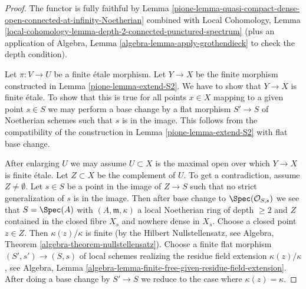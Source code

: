 \begin{proof}

The functor is fully faithful by
Lemma \ref{pione-lemma-quasi-compact-dense-open-connected-at-infinity-Noetherian}
combined with Local Cohomology,
Lemma \ref{local-cohomology-lemma-depth-2-connected-punctured-spectrum}
(plus an application of
Algebra, Lemma \ref{algebra-lemma-apply-grothendieck}
to check the depth condition).

\medskip\noindent
Let $\pi : V \to U$ be a finite \'etale morphism. Let $Y \to X$
be the finite morphism constructed in Lemma \ref{pione-lemma-extend-S2}.
We have to show that $Y \to X$ is finite \'etale.
To show that this is true for all points $x \in X$ mapping to a
given point $s \in S$ we may perform a base change by a flat
morphism $S' \to S$ of Noetherian schemes such that $s$ is
in the image. This follows from the compatibility of the
construction in Lemma \ref{pione-lemma-extend-S2} with flat base change.

\medskip\noindent
After enlarging $U$ we may assume $U \subset X$ is
the maximal open over which $Y \to X$ is finite \'etale.
Let $Z \subset X$ be the complement of $U$.
To get a contradiction, assume $Z \not = \emptyset$.
Let $s \in S$ be a point in the image of $Z \to S$
such that no strict generalization of $s$ is in the image.
Then after base change to $\Spec(\mathcal{O}_{S, s})$
we see that $S = \Spec(A)$ with $(A, \mathfrak m, \kappa)$
a local Noetherian ring of depth $\geq 2$ and $Z$
contained in the closed fibre $X_s$
and nowhere dense in $X_s$. Choose a closed point $z \in Z$.
Then $\kappa(z)/\kappa$ is finite (by the Hilbert Nullstellensatz, see
Algebra, Theorem \ref{algebra-theorem-nullstellensatz}).
Choose a finite flat morphism $(S', s') \to (S, s)$ of local schemes
realizing the residue field extension $\kappa(z)/\kappa$, see
Algebra, Lemma \ref{algebra-lemma-finite-free-given-residue-field-extension}.
After doing a base change by $S' \to S$ we reduce to the case
where $\kappa(z) = \kappa$.


\end{proof}
